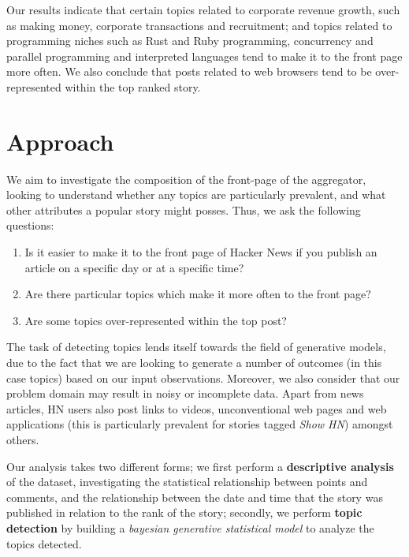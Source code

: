 \documentclass[11pt,journal,final,a4paper]{IEEEtran}
\begin{document}
Our results indicate that certain topics related to corporate revenue growth, such as making money, corporate transactions and recruitment; and topics related to programming niches such as Rust and Ruby programming, concurrency and parallel programming and interpreted languages tend to make it to the front page more often. We also conclude that posts related to web browsers tend to be over-represented within the top ranked story.

\section{Approach}
We aim to investigate the composition of the front-page of the aggregator, looking to understand whether any topics are particularly prevalent, and what other attributes a popular story might posses. Thus, we ask the following questions:
\begin{enumerate}
\item Is it easier to make it to the front page of Hacker News if you publish an article on a specific day or at a specific time?
\item Are there particular topics which make it more often to the front page?
\item Are some topics over-represented within the top post?
\end{enumerate}

The task of detecting topics lends itself towards the field of generative models, due to the fact that we are looking to generate a number of outcomes (in this case topics) based on our input observations\cite{lda:generative}. Moreover, we also consider that our problem domain may result in noisy or incomplete data. Apart from news articles, HN users also post links to videos,  unconventional web pages and web applications (this is particularly prevalent for stories tagged \textit{Show HN}) amongst others.

Our analysis takes two different forms; we first perform a \textbf{descriptive analysis} of the dataset, investigating the statistical relationship between points and comments, and the relationship between the date and time that the story was published in relation to the rank of the story; secondly, we perform \textbf{topic detection} by building a \textit{bayesian generative statistical model} to analyze the topics detected\cite{lda:bgsm}. 
\end{document}
